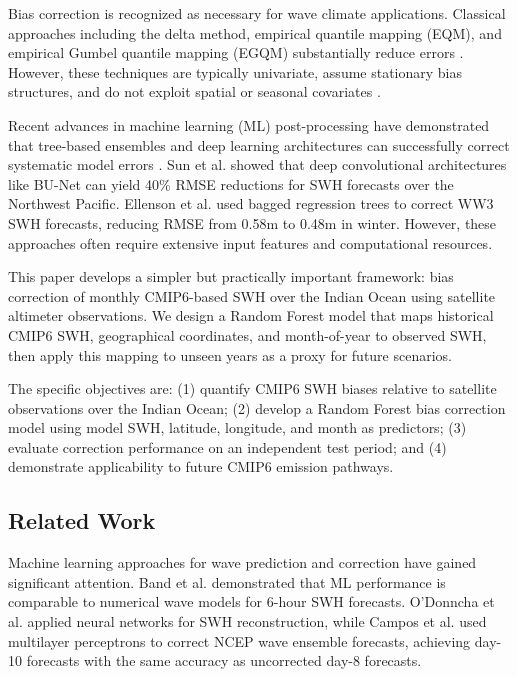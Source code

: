 \documentclass[conference]{IEEEtran}
\begin{document}
Bias correction is recognized as necessary for wave climate applications. Classical approaches including the delta method, empirical quantile mapping (EQM), and empirical Gumbel quantile mapping (EGQM) substantially reduce errors \cite{lemos2020}. However, these techniques are typically univariate, assume stationary bias structures, and do not exploit spatial or seasonal covariates \cite{cannon2018}.

Recent advances in machine learning (ML) post-processing have demonstrated that tree-based ensembles and deep learning architectures can successfully correct systematic model errors \cite{reichstein2019}. Sun et al. \cite{sun2022} showed that deep convolutional architectures like BU-Net can yield 40\% RMSE reductions for SWH forecasts over the Northwest Pacific. Ellenson et al. \cite{ellenson2020} used bagged regression trees to correct WW3 SWH forecasts, reducing RMSE from 0.58m to 0.48m in winter. However, these approaches often require extensive input features and computational resources.

This paper develops a simpler but practically important framework: bias correction of monthly CMIP6-based SWH over the Indian Ocean using satellite altimeter observations. We design a Random Forest model \cite{breiman2001} that maps historical CMIP6 SWH, geographical coordinates, and month-of-year to observed SWH, then apply this mapping to unseen years as a proxy for future scenarios.

The specific objectives are: (1) quantify CMIP6 SWH biases relative to satellite observations over the Indian Ocean; (2) develop a Random Forest bias correction model using model SWH, latitude, longitude, and month as predictors; (3) evaluate correction performance on an independent test period; and (4) demonstrate applicability to future CMIP6 emission pathways.

\subsection{Related Work}

Machine learning approaches for wave prediction and correction have gained significant attention. Band et al. \cite{band2020} demonstrated that ML performance is comparable to numerical wave models for 6-hour SWH forecasts. O'Donncha et al. applied neural networks for SWH reconstruction, while Campos et al. \cite{campos2018} used multilayer perceptrons to correct NCEP wave ensemble forecasts, achieving day-10 forecasts with the same accuracy as uncorrected day-8 forecasts.
\end{document}
